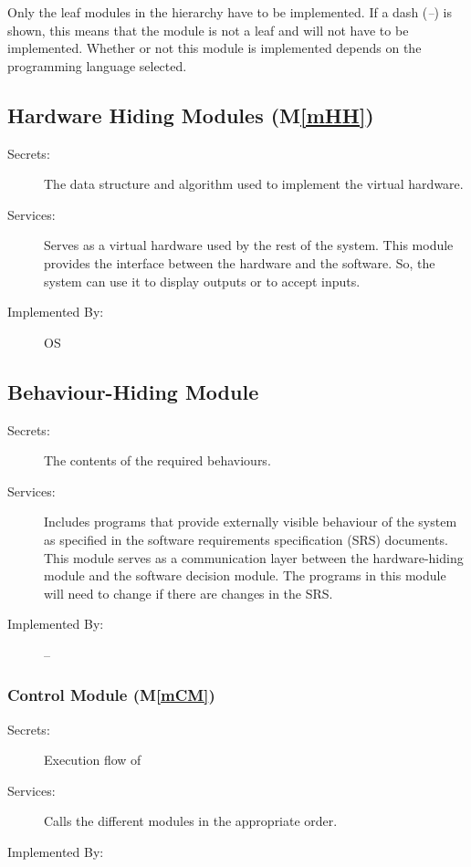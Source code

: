 \documentclass[12pt, titlepage]{article}
\newcommand{\mref}[1]{M\ref{#1}}
\begin{document}
Only the leaf modules in the
hierarchy have to be implemented. If a dash (\emph{--}) is shown, this means
that the module is not a leaf and will not have to be implemented. Whether or
not this module is implemented depends on the programming language
selected.

\subsection{Hardware Hiding Modules (\mref{mHH})}

\begin{description}
\item[Secrets:]The data structure and algorithm used to implement the virtual
  hardware.
\item[Services:]Serves as a virtual hardware used by the rest of the
  system. This module provides the interface between the hardware and the
  software. So, the system can use it to display outputs or to accept inputs.
\item[Implemented By:] OS
\end{description}

\subsection{Behaviour-Hiding Module}

\begin{description}
\item[Secrets:]The contents of the required behaviours.
\item[Services:]Includes programs that provide externally visible behaviour of
  the system as specified in the software requirements specification (SRS)
  documents. This module serves as a communication layer between the
  hardware-hiding module and the software decision module. The programs in this
  module will need to change if there are changes in the SRS.
\item[Implemented By:] --
\end{description}

\subsubsection{\progname Control Module (\mref{mCM})}
\label{MG_Control}
\begin{description}
\item[Secrets:] Execution flow of \progname 
\item[Services:] Calls the different modules in the appropriate order.
\item[Implemented By:] \progname
\end{description}
\end{document}
